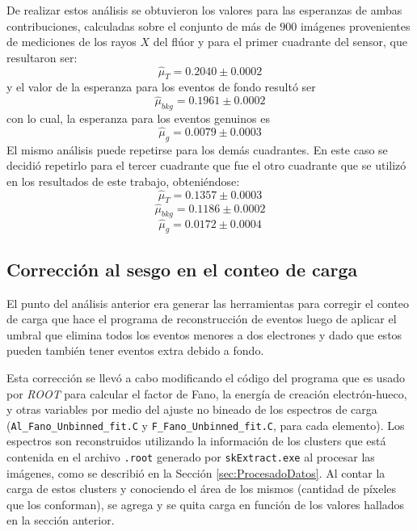 De realizar estos análisis se obtuvieron los valores para las esperanzas de ambas contribuciones, calculadas sobre el conjunto de más de $900$ imágenes provenientes de mediciones de los rayos $X$ del flúor y para el primer cuadrante del sensor, que resultaron ser:
\begin{equation*}
    \hat{\mu}_{T} = 0.2040 \pm 0.0002
\end{equation*}
y el valor de la esperanza para los eventos de fondo resultó  ser
\begin{equation*}
    \hat{\mu}_{bkg} = 0.1961 \pm 0.0002
\end{equation*}
con lo cual, la esperanza para los eventos genuinos es 
\begin{equation*}
    \hat{\mu}_{g} = 0.0079 \pm 0.0003   
\end{equation*}
El mismo análisis puede repetirse para los demás cuadrantes. En este caso se decidió repetirlo para el tercer cuadrante que fue el otro cuadrante que se utilizó en los resultados de este trabajo, obteniéndose:
\begin{equation*}
    \hat{\mu}_{T} = 0.1357 \pm 0.0003
\end{equation*}
\begin{equation*}
    \hat{\mu}_{bkg} = 0.1186 \pm 0.0002
\end{equation*}
\begin{equation*}
    \hat{\mu}_{g} = 0.0172 \pm 0.0004   
\end{equation*}

\subsection{Corrección al sesgo en el conteo de carga}
\noindent El punto del análisis anterior era generar las herramientas para corregir el conteo de carga que hace el programa de reconstrucción de eventos luego de aplicar el umbral que elimina todos los eventos menores a dos electrones y dado que estos pueden también tener eventos extra debido a fondo.

Esta corrección se llevó a cabo modificando el código del programa que es usado por \textit{ROOT} para calcular el factor de Fano, la energía de creación electrón-hueco, y otras variables por medio del ajuste no bineado de los espectros de carga (\verb|Al_Fano_Unbinned_fit.C| y \verb|F_Fano_Unbinned_fit.C|, para cada elemento). Los espectros son reconstruidos utilizando la información de los clusters que está contenida en el archivo \verb|.root| generado por \verb|skExtract.exe| al procesar las imágenes, como se describió en la Sección \ref{sec:ProcesadoDatos}. Al contar la carga de estos clusters y conociendo el área de los mismos (cantidad de píxeles que los conforman), se agrega y se quita carga en función de los valores hallados en la sección anterior.

